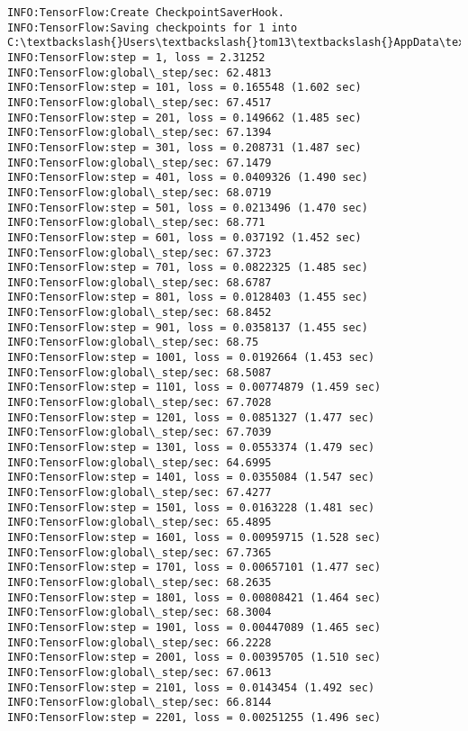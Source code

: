 \documentclass[11pt]{article}
\begin{document}
    \begin{Verbatim}[commandchars=\\\{\}]
INFO:TensorFlow:Create CheckpointSaverHook.
INFO:TensorFlow:Saving checkpoints for 1 into C:\textbackslash{}Users\textbackslash{}tom13\textbackslash{}AppData\textbackslash{}Local\textbackslash{}Temp\textbackslash{}tmp97az0nju\textbackslash{}model.ckpt.
INFO:TensorFlow:step = 1, loss = 2.31252
INFO:TensorFlow:global\_step/sec: 62.4813
INFO:TensorFlow:step = 101, loss = 0.165548 (1.602 sec)
INFO:TensorFlow:global\_step/sec: 67.4517
INFO:TensorFlow:step = 201, loss = 0.149662 (1.485 sec)
INFO:TensorFlow:global\_step/sec: 67.1394
INFO:TensorFlow:step = 301, loss = 0.208731 (1.487 sec)
INFO:TensorFlow:global\_step/sec: 67.1479
INFO:TensorFlow:step = 401, loss = 0.0409326 (1.490 sec)
INFO:TensorFlow:global\_step/sec: 68.0719
INFO:TensorFlow:step = 501, loss = 0.0213496 (1.470 sec)
INFO:TensorFlow:global\_step/sec: 68.771
INFO:TensorFlow:step = 601, loss = 0.037192 (1.452 sec)
INFO:TensorFlow:global\_step/sec: 67.3723
INFO:TensorFlow:step = 701, loss = 0.0822325 (1.485 sec)
INFO:TensorFlow:global\_step/sec: 68.6787
INFO:TensorFlow:step = 801, loss = 0.0128403 (1.455 sec)
INFO:TensorFlow:global\_step/sec: 68.8452
INFO:TensorFlow:step = 901, loss = 0.0358137 (1.455 sec)
INFO:TensorFlow:global\_step/sec: 68.75
INFO:TensorFlow:step = 1001, loss = 0.0192664 (1.453 sec)
INFO:TensorFlow:global\_step/sec: 68.5087
INFO:TensorFlow:step = 1101, loss = 0.00774879 (1.459 sec)
INFO:TensorFlow:global\_step/sec: 67.7028
INFO:TensorFlow:step = 1201, loss = 0.0851327 (1.477 sec)
INFO:TensorFlow:global\_step/sec: 67.7039
INFO:TensorFlow:step = 1301, loss = 0.0553374 (1.479 sec)
INFO:TensorFlow:global\_step/sec: 64.6995
INFO:TensorFlow:step = 1401, loss = 0.0355084 (1.547 sec)
INFO:TensorFlow:global\_step/sec: 67.4277
INFO:TensorFlow:step = 1501, loss = 0.0163228 (1.481 sec)
INFO:TensorFlow:global\_step/sec: 65.4895
INFO:TensorFlow:step = 1601, loss = 0.00959715 (1.528 sec)
INFO:TensorFlow:global\_step/sec: 67.7365
INFO:TensorFlow:step = 1701, loss = 0.00657101 (1.477 sec)
INFO:TensorFlow:global\_step/sec: 68.2635
INFO:TensorFlow:step = 1801, loss = 0.00808421 (1.464 sec)
INFO:TensorFlow:global\_step/sec: 68.3004
INFO:TensorFlow:step = 1901, loss = 0.00447089 (1.465 sec)
INFO:TensorFlow:global\_step/sec: 66.2228
INFO:TensorFlow:step = 2001, loss = 0.00395705 (1.510 sec)
INFO:TensorFlow:global\_step/sec: 67.0613
INFO:TensorFlow:step = 2101, loss = 0.0143454 (1.492 sec)
INFO:TensorFlow:global\_step/sec: 66.8144
INFO:TensorFlow:step = 2201, loss = 0.00251255 (1.496 sec)

\end{Verbatim}
\end{document}
